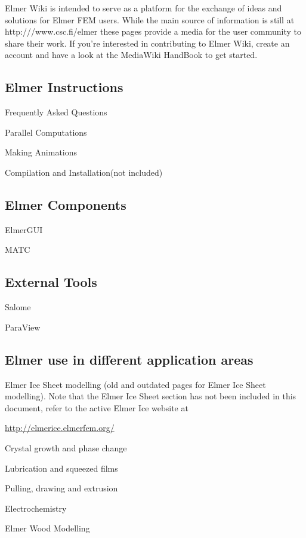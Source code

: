 Elmer Wiki is intended to serve as a platform for the exchange of ideas and solutions for Elmer FEM users. While the main source of information is still at http:///www.csc.fi/elmer these pages provide a media for the user community to share their work. If you're interested in contributing to Elmer Wiki, create an account and have a look at the MediaWiki HandBook to get started.

\subsection{Elmer Instructions}

\noindent Frequently Asked Questions

\noindent Parallel Computations

\noindent Making Animations

\noindent Compilation and Installation(not included)

\subsection{Elmer Components}

\noindent ElmerGUI

\noindent MATC

\subsection{External Tools}

\noindent Salome

\noindent ParaView

\subsection{Elmer use in different application areas}

\noindent Elmer Ice Sheet modelling (old and outdated pages for Elmer Ice Sheet modelling).  Note that the Elmer Ice Sheet section has not been included in this document, refer to the active Elmer Ice website at

\url{http://elmerice.elmerfem.org/}

\noindent Crystal growth and phase change

\noindent Lubrication and squeezed films

\noindent Pulling, drawing and extrusion

\noindent Electrochemistry

\noindent Elmer Wood Modelling

